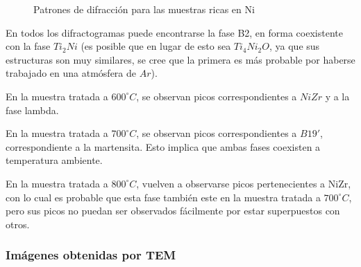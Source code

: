 \documentclass[12pt]{article}
\theoremstyle{definition}
\theoremstyle{remark}
\begin{document}
{\begin{figure}[H]
\caption{Patrones de difracción para las muestras ricas en Ni}
\label{RXNiPoor}
\end{figure}


En todos los difractogramas puede encontrarse la fase B2, en forma coexistente con la fase $Ti_2Ni$ (es posible que en lugar de esto sea $Ti_4Ni_2O$, ya que sus estructuras son muy similares, se cree que la primera es más probable por haberse trabajado en una atmósfera de $Ar$).

En la muestra tratada a $600 ^\circ C$, se observan picos correspondientes a $NiZr$ y a la fase lambda.

En la muestra tratada a $700 ^\circ C$, se observan picos correspondientes a $B19'$, correspondiente a la martensita. Esto implica que ambas fases coexisten a temperatura ambiente.

En la muestra tratada a $800 ^\circ C$, vuelven a observarse picos pertenecientes a NiZr, con lo cual es probable que esta fase también este en la muestra tratada a $700 ^\circ C$, pero sus picos no puedan ser observados fácilmente por estar superpuestos con otros.

\subsubsection{Imágenes obtenidas por TEM}

}
\end{document}

